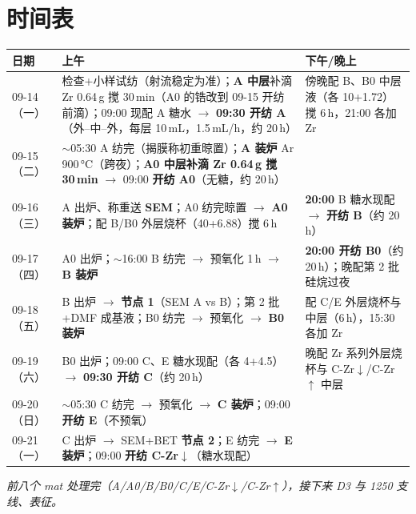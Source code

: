 \documentclass[a4paper, 11pt]{ctexart}
\begin{document}
\section*{时间表}
\renewcommand{\arraystretch}{1.35}
\begin{tabular}{p{2.1cm}p{6.4cm}p{6.4cm}}
\toprule
日期 & 上午 & 下午/晚上 \\
\midrule
09-14（一）& 检查+小样试纺（射流稳定为准）；\textbf{A 中层}补滴 Zr 0.64\,g 搅 30\,min（A0 的锆改到 09-15 开纺前滴）；09:00 现配 A 糖水 $\rightarrow$ \textbf{09:30 开纺 A}（外--中--外，每层 10\,mL，1.5\,mL/h，约 20\,h）& 傍晚配 B、B0 中层液（各 10+1.72）搅 6\,h，21:00 各加 Zr \\
09-15（二）& $\sim$05:30 A 纺完（揭膜称初重晾置）；\textbf{A 装炉} Ar 900\,°C（跨夜）；\textbf{A0 中层补滴 Zr 0.64\,g 搅 30\,min} $\rightarrow$ 09:00 \textbf{开纺 A0}（无糖，约 20\,h）& \\
09-16（三）& A 出炉、称重送 \textbf{SEM}；A0 纺完晾置 $\rightarrow$ \textbf{A0 装炉}；配 B/B0 外层烧杯（40+6.88）搅 6\,h & \textbf{20:00} B 糖水现配 $\rightarrow$ \textbf{开纺 B}（约 20\,h）\\
09-17（四）& A0 出炉；$\sim$16:00 B 纺完 $\rightarrow$ 预氧化 1\,h $\rightarrow$ \textbf{B 装炉} & \textbf{20:00 开纺 B0}（约 20\,h）；晚配第 2 批硅烷过夜 \\
09-18（五）& B 出炉 $\rightarrow$ \textbf{节点 1}（SEM A vs B）；第 2 批 +DMF 成基液；B0 纺完 $\rightarrow$ 预氧化 $\rightarrow$ \textbf{B0 装炉} & 配 C/E 外层烧杯与中层（6\,h），15:30 各加 Zr \\
09-19（六）& B0 出炉；09:00 C、E 糖水现配（各 4+4.5）$\rightarrow$ \textbf{09:30 开纺 C}（约 20\,h）& 晚配 Zr 系列外层烧杯与 C-Zr$\downarrow$/C-Zr$\uparrow$ 中层 \\
09-20（日）& $\sim$05:30 C 纺完 $\rightarrow$ 预氧化 $\rightarrow$ \textbf{C 装炉}；09:00 \textbf{开纺 E}（不预氧）& \\
09-21（一）& C 出炉 $\rightarrow$ SEM+BET \textbf{节点 2}；E 纺完 $\rightarrow$ \textbf{E 装炉}；09:00 \textbf{开纺 C-Zr$\downarrow$}（糖水现配）& \\
\bottomrule
\end{tabular}

{\small\itshape 前八个 mat 处理完（A/A0/B/B0/C/E/C-Zr$\downarrow$/C-Zr$\uparrow$），接下来 D3 与 1250 支线、表征。}
\end{document}
